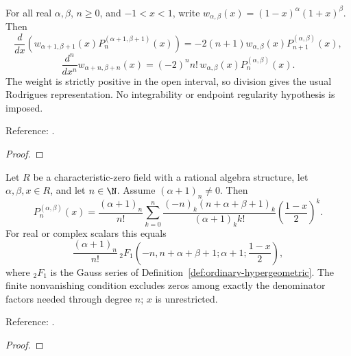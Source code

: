 \begin{theorem}
\label{thm:jacobi-rodrigues}
\leanok
For all real $\alpha,\beta$, $n\ge0$, and $-1<x<1$, write
$w_{\alpha,\beta}(x)=(1-x)^\alpha(1+x)^\beta$. Then
\[\frac{d}{dx}\left(w_{\alpha+1,\beta+1}(x)P_n^{(\alpha+1,\beta+1)}(x)\right)
 =-2(n+1)w_{\alpha,\beta}(x)P_{n+1}^{(\alpha,\beta)}(x),\]
\[\frac{d^n}{dx^n}w_{\alpha+n,\beta+n}(x)
 =(-2)^n n!\,w_{\alpha,\beta}(x)P_n^{(\alpha,\beta)}(x).\]
The weight is strictly positive in the open interval, so division gives the
usual Rodrigues representation. No integrability or endpoint regularity
hypothesis is imposed.

Reference: \cite[18.9.16, 18.5.5 and Table 18.5.1]{dlmf}.
\end{theorem}
\begin{proof}
\leanok
\end{proof}

\begin{theorem}
\label{thm:jacobi-representations}
\leanok
Let $R$ be a characteristic-zero field with a rational algebra structure, let $\alpha,\beta,x\in R$, and let $n\in\N$. Assume $(\alpha+1)_n\ne0$. Then
\[P_n^{(\alpha,\beta)}(x)=\frac{(\alpha+1)_n}{n!}
 \sum_{k=0}^n\frac{(-n)_k(n+\alpha+\beta+1)_k}{(\alpha+1)_k k!}
 \left(\frac{1-x}{2}\right)^k.\]
For real or complex scalars this equals
\[\frac{(\alpha+1)_n}{n!}\,
 {}_2F_1\left(-n,n+\alpha+\beta+1;\alpha+1;\frac{1-x}{2}\right),\]
where ${}_2F_1$ is the Gauss series of Definition~\ref{def:ordinary-hypergeometric}. The finite nonvanishing condition excludes
zeros among exactly the denominator factors needed through degree $n$;
$x$ is unrestricted.

Reference: \cite[18.5.7]{dlmf}.
\end{theorem}
\begin{proof}
\leanok
\end{proof}

